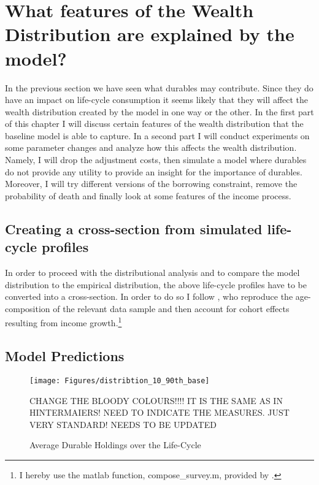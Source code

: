 \documentclass[a4paper,12pt]{article}
\begin{document}
\label{Chapter4}


\section{What features of the Wealth Distribution are explained by the model?}
\label{Chapter5}
In the previous section we have seen what durables may contribute. Since they do have an impact on life-cycle consumption it seems likely that they will affect the wealth distribution created by the model in one way or the other. 
In the first part of this chapter I will discuss certain features of the wealth distribution that the baseline model is able to capture. In a second part I will conduct experiments on some parameter changes and analyze how this affects the wealth distribution. Namely, I will drop the adjustment costs, then simulate a model where durables do not provide any utility to provide an insight for the importance of durables. Moreover, I will try different versions of the borrowing constraint, remove the probability of death and finally look at some features of the income process. 

\subsection{Creating a cross-section from simulated life-cycle profiles}
In order to proceed with the distributional analysis and to compare the model distribution to the empirical distribution, the above life-cycle profiles have to be converted into a cross-section. In order to do so I follow \cite{hintermaier2011}, who reproduce the age-composition of the relevant data sample and then account for cohort effects resulting from income growth.\footnote{I hereby use the matlab function, compose\_survey.m, provided by \cite{hintermaier2016}.}

\subsection{Model Predictions}


\begin{figure}[!htbp]
\caption{Average Durable Holdings over the Life-Cycle} 
\label{wealth_distr_base}	%
\centering
\texttt{[image: Figures/distribtion\_10\_90th\_base]}  %

\begin{minipage}{0.8\linewidth}
\footnotesize{CHANGE THE BLOODY COLOURS!!!! IT IS THE SAME AS IN HINTERMAIERS! NEED TO INDICATE THE MEASURES. JUST VERY STANDARD! NEEDS TO BE UPDATED}
\end{minipage}

\end{figure}
\end{document}
